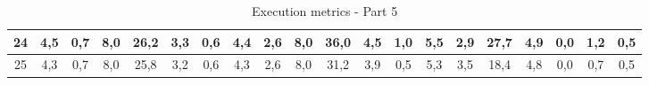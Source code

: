 \begin{sidewaystable}[]
\begin{tabular}{|c|c|c|c|c|c|c|c|c|c|c|c|c|c|c|c|c|c|c|c|}
    24 & 4,5                                              & 0,7                                              & 8,0                                              & 26,2                                             & 3,3                                              & 0,6                                              & 4,4                                              & 2,6                                              & 8,0                                              & 36,0                                             & 4,5                                              & 1,0                                              & 5,5                                              & 2,9                                              & 27,7                                             & 4,9                                              & 0,0                                              & 1,2                                              & 0,5                                              \\ \hline
    25 & 4,3                                              & 0,7                                              & 8,0                                              & 25,8                                             & 3,2                                              & 0,6                                              & 4,3                                              & 2,6                                              & 8,0                                              & 31,2                                             & 3,9                                              & 0,5                                              & 5,3                                              & 3,5                                              & 18,4                                             & 4,8                                              & 0,0                                              & 0,7                                              & 0,5                                              \\ \hline
    \end{tabular}
    \caption{Execution metrics - Part 5}
    \label{tab:ap:exec_metrics_5}
\end{sidewaystable}

